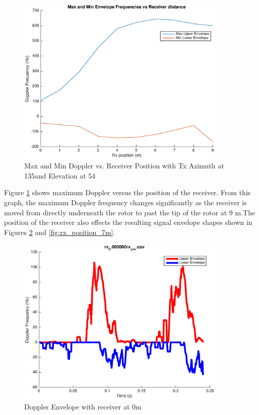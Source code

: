 \begin{figure}
	\begin{center}
		\includegraphics[width=10cm]{images/simulation/receiver_position_max_doppler.eps}
		\caption{Max and Min Doppler vs. Receiver Position with Tx Azimuth at 135\textdegree \space and Elevation at 54\textdegree}
		\label{fig:rx_position}
	\end{center}
\end{figure}

Figure \ref{fig:rx_position} shows maximum Doppler versus the position of the receiver. From this graph, the maximum Doppler frequency changes significantly as the receiver is moved from directly underneath the rotor to past the tip of the rotor at 9 m.The position of the receiver also effects the resulting signal envelope shapes shown in Figures \ref{fig:rx_position_0m} and \ref{fig:rx_position_7m}.

\begin{figure}
	\begin{center}
		\includegraphics[width=10cm]{images/simulation/Doppler_Receiver_0m.eps}
		\caption{Doppler Envelope with receiver at 0m}
		\label{fig:rx_position_0m}
	\end{center}
\end{figure}

